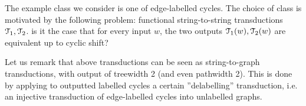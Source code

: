 The example class we consider is one of edge-labelled cycles. The choice of class is motivated by the following problem: 
	{functional string-to-string \mso transductions ${\mathcal T}_1,{\mathcal T}_2$.}
	{is it the case that for every input $w$, the two outputs  ${\mathcal T}_1(w),{\mathcal T}_2(w)$ are equivalent up to cyclic shift?}
\iffalse
\mso string-to-string transductions can be defined by string-to-($\Sigma^*, \cdot$) register transducers (fill-in reference), and in consequence, when considered modulo cyclic shift-equivalence, they can be seen as string-to-\algcyclic register transducers, where \algcyclic is the following (sorted) algebra: (fill-in czy używać sortów. Są one przydatne też przy dowodzie kompozycjonalności szeregu ścieżkowego, ale sam nie jestem przekonany)
\algebradefinition{
	$\algcyclic_1$: (sort 1 ) words of positive length over alphabet $\Sigma$,\\
	$\algcyclic_0$: (sort 0 ) cyclic words of positive length, labelled by alphabet $\Sigma$.
}
{
	$\cdot : \algcyclic_1 \times \algcyclic_1 \to \algcyclic_1$ - concatenation of words.\\
	$\cyclic:\algcyclic_1 \to \algcyclic_0$ - maps a word to cyclic word it represents.\\
}
\fi
Let us remark that above transductions can be seen as \mso string-to-graph transductions, with output of treewidth 2 (and even pathwidth 2). This is done by applying to outputted labelled cycles a certain ''delabelling'' transduction, i.e. an injective \mso transduction of edge-labelled cycles into unlabelled graphs. %
%	


